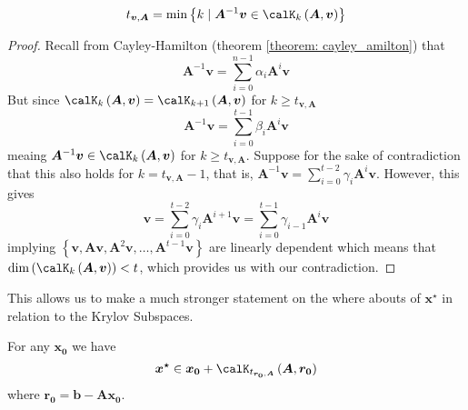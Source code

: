 \begin{cor} \label{theorem: grade_as_min}
    \[
        t_{\bm{v}, \bm{A}} = \min \left\{k \mid \bm{A}^{-1} \bm{v} \in \calK_{k} \left( \bm{A},\bm{v} \right) \right\}
    \]
\end{cor}
\begin{proof}
    Recall from Cayley-Hamilton (theorem \ref{theorem: cayley_amilton}) that
    \[
        \bm{A}^{-1} \bm{v} = \sum_{i=0}^{n-1} \alpha_{i} \bm{A}^{i} \bm{v}
    \]
    But since $\calK_{k} \left( \bm{A},\bm{v} \right) = \calK_{k+1} \left( \bm{A},\bm{v} \right)$ for $k \geq t_{\bm{v}, \bm{A}}$
    \[
        \bm{A}^{-1} \bm{v} = \sum_{i=0}^{t-1} \beta_{i} \bm{A}^{i} \bm{v}
    \]
    meaing $\bm{A}^{-1} \bm{v} \in \calK_{k} \left( \bm{A},\bm{v} \right)$ for $k \geq t_{\bm{v}, \bm{A}}$. Suppose for the sake of contradiction that this also holds for $k = t_{\bm{v}, \bm{A}} - 1$, that is, $\bm{A}^{-1} \bm{v} = \sum_{i=0}^{t-2} \gamma_{i} \bm{A}^{i} \bm{v}$. However, this gives
    \[
        \bm{v} = \sum_{i=0}^{t-2} \gamma_{i} \bm{A}^{i+1} \bm{v} = \sum_{i=0}^{t-1} \gamma_{i-1} \bm{A}^{i} \bm{v}
    \]
    implying $\left\{ \bm{v}, \bm{A} \bm{v}, \bm{A}^2 \bm{v}, \ldots , \bm{A}^{t-1} \bm{v} \right\}$ are linearly dependent which means that $\operatorname{dim} \left( \calK_{k} \left( \bm{A} , \bm{v} \right) \right) < t$, which provides us with our contradiction.
\end{proof}
This allows us to make a much stronger statement on the where abouts of $\bm{x^{\star}}$ in relation to the Krylov Subspaces.
\begin{cor} \label{theorem: sol_in_krylov}
    For any $\bm{x_0}$ we have
    \[
        \bm{x^{\star}} \in \bm{x_0} + \calK_{t_{\bm{r_0}, \bm{A}}} \left( \bm{A},\bm{r_0} \right)
    \]
    where $\bm{r_0} = \bm{b} - \bm{A} \bm{x_0}$.
\end{cor}